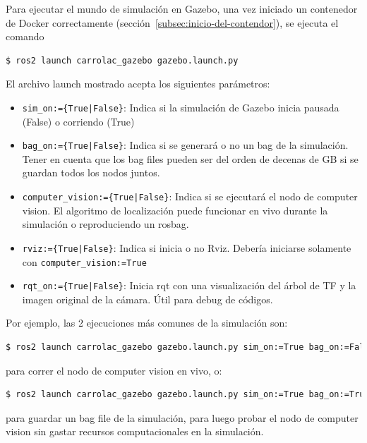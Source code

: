 \documentclass[12pt, a4paper]{report}
\begin{document}
				Para ejecutar el mundo de simulación en Gazebo, una vez iniciado un contenedor de Docker correctamente (sección~\ref{subsec:inicio-del-contendor}), se ejecuta el comando
				\begin{lstlisting}[language=Bash, label={lst:launch_gazebo}]
$ ros2 launch carrolac_gazebo gazebo.launch.py
				\end{lstlisting}
				El archivo launch mostrado acepta los siguientes parámetros:
				\begin{itemize}
					\item \texttt{sim\_on:=\{True|False\}}: Indica si la simulación de Gazebo inicia pausada (False) o corriendo (True)
					\item \texttt{bag\_on:=\{True|False\}}: Indica si se generará o no un bag de la simulación.
						Tener en cuenta que los bag files pueden ser del orden de decenas de GB si se guardan todos los nodos juntos.
					\item \texttt{computer\_vision:=\{True|False\}}: Indica si se ejecutará el nodo de computer vision.
						El algoritmo de localización puede funcionar en vivo durante la simulación o reproduciendo un rosbag.
					\item \texttt{rviz:=\{True|False\}}: Indica si inicia o no Rviz.
					 	Debería iniciarse solamente con \texttt{computer\_vision:=True}
					\item \texttt{rqt\_on:=\{True|False\}}: Inicia rqt con una visualización del árbol de TF y la imagen original de la cámara.
						Útil para debug de códigos.
				\end{itemize}
				Por ejemplo, las 2 ejecuciones más comunes de la simulación son:
				\begin{lstlisting}[language=Bash, label={lst:launch_gazebo_cvon}]
$ ros2 launch carrolac_gazebo gazebo.launch.py sim_on:=True bag_on:=False computer_vision:=True rviz:=True, rqt_on:=False
				\end{lstlisting}
				para correr el nodo de computer vision en vivo, o:
				\begin{lstlisting}[language=Bash, label={lst:launch_gazebo_cvoff}]
$ ros2 launch carrolac_gazebo gazebo.launch.py sim_on:=True bag_on:=True computer_vision:=False rviz:=False, rqt_on:=False
				\end{lstlisting}
				para guardar un bag file de la simulación, para luego probar el nodo de computer vision sin gastar recursos computacionales en la simulación.
\end{document}
